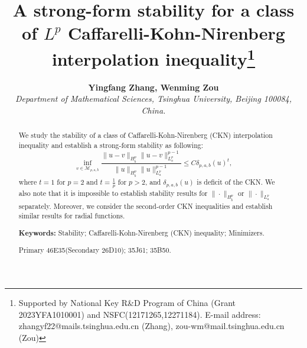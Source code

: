 \documentclass[11pt]{article}
\title{\bf A strong-form stability for a class of $L^p$ Caffarelli-Kohn-Nirenberg  interpolation inequality\thanks{Supported by National Key R\&D Program of China (Grant 2023YFA1010001) and NSFC(12171265,12271184). E-mail address:
zhangyf22@mails.tsinghua.edu.cn (Zhang), zou-wm@mail.tsinghua.edu.cn (Zou)} }
\author{{\bf Yingfang Zhang, Wenming Zou}  \\ {\footnotesize \it  Department of Mathematical Sciences, Tsinghua University, Beijing 100084, China.} }
\date{}
\numberwithin{equation}{section}
\begin{document}
\maketitle

\begin{abstract}
\noindent We study the stability of a class of Caffarelli-Kohn-Nirenberg (CKN) interpolation inequality   and establish a strong-form stability as following:
    \begin{equation*}
        \inf_{v\in\mathcal{M}_{p,a,b}}\frac{ \|u-v\|_{H_b^p} \|u-v\|_{L^p_a}^{p-1} }{\|u\|_{H^p_b}\|u\|_{L^p_a}^{p-1}} \le C\delta_{p,a,b}(u)^{t},
    \end{equation*}
where $t=1$ for $p=2$ and $t=\frac{1}{p}$ for $p>2$, and $\delta_{p,a,b}(u)$ is deficit of the CKN. We also note that it is impossible to establish stability results for $\|\cdot\|_{H_b^p}$ or $\|\cdot\|_{L_a^p}$ separately. Moreover, we consider the second-order CKN inequalities and establish similar results for radial functions.

\vskip0.1in

\noindent\textbf{Keywords:}  Stability;  Caffarelli-Kohn-Nirenberg (CKN) inequality;  Minimizers.

\vskip0.1in
 Primary 46E35(Secondary 26D10);  35J61;  35B50.

\end{abstract}
\end{document}
